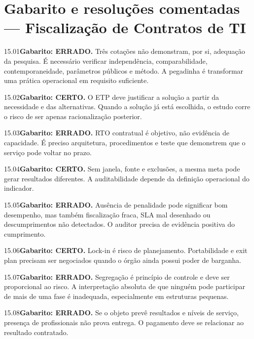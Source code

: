 \section{Gabarito e resoluções comentadas — Fiscalização de Contratos de TI}

\begin{solucao}{15.01}\textbf{Gabarito: ERRADO.} Três cotações não demonstram, por si, adequação da pesquisa. É necessário verificar independência, comparabilidade, contemporaneidade, parâmetros públicos e método. A pegadinha é transformar uma prática operacional em requisito suficiente.\end{solucao}
\begin{solucao}{15.02}\textbf{Gabarito: CERTO.} O ETP deve justificar a solução a partir da necessidade e das alternativas. Quando a solução já está escolhida, o estudo corre o risco de ser apenas racionalização posterior.\end{solucao}
\begin{solucao}{15.03}\textbf{Gabarito: ERRADO.} RTO contratual é objetivo, não evidência de capacidade. É preciso arquitetura, procedimentos e teste que demonstrem que o serviço pode voltar no prazo.\end{solucao}
\begin{solucao}{15.04}\textbf{Gabarito: CERTO.} Sem janela, fonte e exclusões, a mesma meta pode gerar resultados diferentes. A auditabilidade depende da definição operacional do indicador.\end{solucao}
\begin{solucao}{15.05}\textbf{Gabarito: ERRADO.} Ausência de penalidade pode significar bom desempenho, mas também fiscalização fraca, SLA mal desenhado ou descumprimentos não detectados. O auditor precisa de evidência positiva do cumprimento.\end{solucao}
\begin{solucao}{15.06}\textbf{Gabarito: CERTO.} Lock-in é risco de planejamento. Portabilidade e exit plan precisam ser negociados quando o órgão ainda possui poder de barganha.\end{solucao}
\begin{solucao}{15.07}\textbf{Gabarito: ERRADO.} Segregação é princípio de controle e deve ser proporcional ao risco. A interpretação absoluta de que ninguém pode participar de mais de uma fase é inadequada, especialmente em estruturas pequenas.\end{solucao}
\begin{solucao}{15.08}\textbf{Gabarito: ERRADO.} Se o objeto prevê resultados e níveis de serviço, presença de profissionais não prova entrega. O pagamento deve se relacionar ao resultado contratado.\end{solucao}
